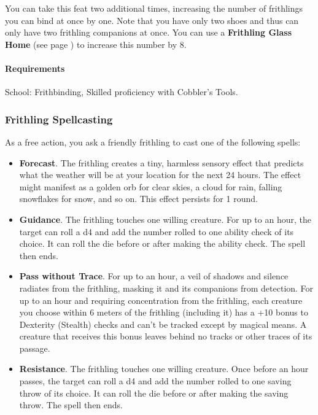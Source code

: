     You can take this feat two additional times, increasing the number of frithlings you can bind at once by one.
    Note that you have only two shoes and thus can only have two frithling companions at once.
    You can use a \textbf{Frithling Glass Home} (see page \pageref{item::frithlingglasshome}) to increase this number by 8.
    \paragraph{Requirements} School: Frithbinding, Skilled proficiency with Cobbler's Tools.
\subsubsection{Frithling Spellcasting} \label{feat::frithlingspellcasting}
    As a free action, you ask a friendly frithling to cast one of the following spells:
    \begin{itemize}
        \item \textbf{Forecast}.
        The frithling creates a tiny, harmless sensory effect that predicts what the weather will be at your location for the next 24 hours.
        The effect might manifest as a golden orb for clear skies, a cloud for rain, falling snowflakes for snow, and so on.
        This effect persists for 1 round.
        \item \textbf{Guidance}.
        The frithling touches one willing creature.
        For up to an hour, the target can roll a d4 and add the number rolled to one ability check of its choice.
        It can roll the die before or after making the ability check.
        The spell then ends.
        \item \textbf{Pass without Trace}.
        For up to an hour, a veil of shadows and silence radiates from the frithling, masking it and its companions from detection.
        For up to an hour and requiring concentration from the frithling, each creature you choose within 6 meters of the frithling (including it) has a +10 bonus to Dexterity (Stealth) checks and can't be tracked except by magical means.
        A creature that receives this bonus leaves behind no tracks or other traces of its passage.
        \item \textbf{Resistance}.
        The frithling touches one willing creature.
        Once before an hour passes, the target can roll a d4 and add the number rolled to one saving throw of its choice.
        It can roll the die before or after making the saving throw.
        The spell then ends.
    \end{itemize}

